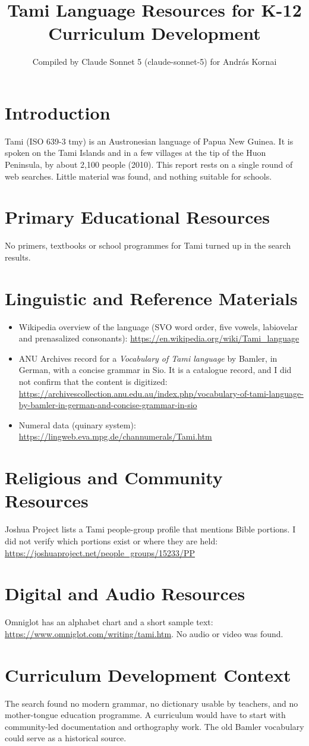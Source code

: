 \documentclass[12pt]{article}
\title{Tami Language Resources for K-12 Curriculum Development}
\author{Compiled by Claude Sonnet 5 (claude-sonnet-5) for Andr\'as Kornai}
\date{}
\begin{document}
\maketitle

\section{Introduction}
Tami (ISO 639-3 tmy) is an Austronesian language of Papua New Guinea. It is spoken on the Tami Islands and in a few villages at the tip of the Huon Peninsula, by about 2,100 people (2010). This report rests on a single round of web searches. Little material was found, and nothing suitable for schools.

\section{Primary Educational Resources}
No primers, textbooks or school programmes for Tami turned up in the search results.

\section{Linguistic and Reference Materials}
\begin{itemize}
\item Wikipedia overview of the language (SVO word order, five vowels, labiovelar and prenasalized consonants): \url{https://en.wikipedia.org/wiki/Tami_language}
\item ANU Archives record for a \emph{Vocabulary of Tami language} by Bamler, in German, with a concise grammar in Sio. It is a catalogue record, and I did not confirm that the content is digitized: \url{https://archivescollection.anu.edu.au/index.php/vocabulary-of-tami-language-by-bamler-in-german-and-concise-grammar-in-sio}
\item Numeral data (quinary system): \url{https://lingweb.eva.mpg.de/channumerals/Tami.htm}
\end{itemize}

\section{Religious and Community Resources}
Joshua Project lists a Tami people-group profile that mentions Bible portions. I did not verify which portions exist or where they are held: \url{https://joshuaproject.net/people_groups/15233/PP}

\section{Digital and Audio Resources}
Omniglot has an alphabet chart and a short sample text: \url{https://www.omniglot.com/writing/tami.htm}. No audio or video was found.

\section{Curriculum Development Context}
The search found no modern grammar, no dictionary usable by teachers, and no mother-tongue education programme. A curriculum would have to start with community-led documentation and orthography work. The old Bamler vocabulary could serve as a historical source.
\end{document}
